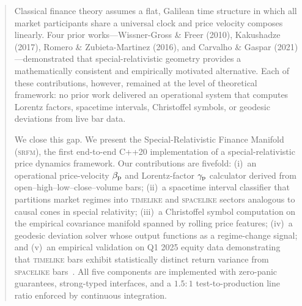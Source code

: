 \begin{abstract}

Classical finance theory assumes a flat, Galilean time structure in which all
market participants share a universal clock and price velocity composes
linearly.  Four prior works---Wissner-Gross \& Freer (2010), Kakushadze
(2017), Romero \& Zubieta-Martinez (2016), and Carvalho \& Gaspar
(2021)---demonstrated that special-relativistic geometry provides a
mathematically consistent and empirically motivated alternative.  Each of
these contributions, however, remained at the level of theoretical framework:
no prior work delivered an operational system that computes Lorentz factors,
spacetime intervals, Christoffel symbols, or geodesic deviations from live
\ohlcv{} bar data.

We close this gap.  We present the Special-Relativistic Finance Manifold
(\textsc{srfm}), the first end-to-end C++20 implementation of a
special-relativistic price dynamics framework.  Our contributions are
fivefold: (i)~an operational price-velocity $\pbeta$ and Lorentz-factor
$\pgamma$ calculator derived from open--high--low--close--volume bars; (ii)~a
spacetime interval classifier that partitions market regimes into
\textsc{timelike} and \textsc{spacelike} sectors analogous to causal cones in
special relativity; (iii)~a Christoffel symbol computation on the empirical
covariance manifold spanned by rolling price features; (iv)~a geodesic
deviation solver whose output functions as a regime-change signal; and (v)~an
empirical validation on Q1 2025 equity data demonstrating that
\textsc{timelike} bars exhibit statistically distinct return variance from
\textsc{spacelike} bars~\cite{AGT07results}.  All five components are
implemented with zero-panic guarantees, strong-typed interfaces, and a
$1.5:1$ test-to-production line ratio enforced by continuous integration.

\end{abstract}
